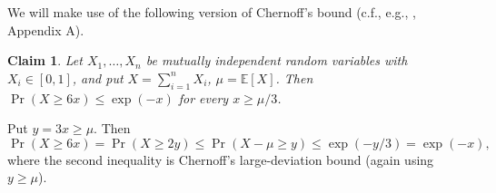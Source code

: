 \documentclass[11pt]{article}
\makeatletter
\renewenvironment{proof}[1][\proofname]
{\par\pushQED{\qed}
	\normalfont\topsep6\p@\@plus6\p@\relax\trivlist
	\item[\hskip\labelsep\bfseries#1\@addpunct{.}]
	\ignorespaces}
{\popQED\endtrivlist\@endpefalse}
\newtheorem{theo}{Theorem}[section]
\newtheorem{claim}[theo]{Claim}
\newcommand{\Ex}{\mathbb{E}}
\makeatother
\begin{document}
We will make use of the following version of Chernoff's bound
(c.f., e.g., \cite{AS}, Appendix A).
\begin{claim}\label{claim:Chernoff}
	Let $X_1,\ldots,X_n$ be mutually independent random variables with $X_i \in [0,1]$,
	and put $X=\sum_{i=1}^n X_i$, $\mu = \Ex[X]$.
	Then $\Pr(X \ge 6x) \le \exp(-x)$ for every $x \ge \mu/3$.
\end{claim}
\begin{proof}
	Put $y = 3x \ge \mu$. Then
	$\Pr(X \ge 6x) = \Pr(X \ge 2y) \le \Pr(X-\mu \ge y) \le \exp(-y/3) = \exp(-x),$
	where the second inequality is Chernoff's large-deviation bound (again using $y \ge \mu$).
\end{proof}
\end{document}
